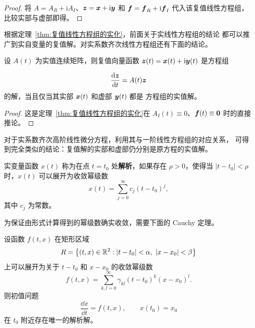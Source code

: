 \begin{proof}
	将 $A=A_R+\mathrm{i}A_I$、$\boldsymbol{z}=\boldsymbol{x}+\mathrm{i}\boldsymbol{y}$
	和 $\boldsymbol{f}=\boldsymbol{f}_R+\mathrm{i}\boldsymbol{f}_I$ 代入该复值线性方程组，
	比较实部与虚部即得。
\end{proof}

根据定理~\ref{thm:复值线性方程组的实化}，前面关于实线性方程组的结论
都可以推广到实自变量的复值解。对实系数齐次线性方程组还有下面的结论。

\begin{proposition}\label{thm:实系数齐次方程组的复值解}
	设 $A(t)$ 为实值连续矩阵，则复值向量函数
	$\boldsymbol{z}(t)=\boldsymbol{x}(t)+\mathrm{i}\boldsymbol{y}(t)$ 是方程组

	\[ 	\dfrac{\mathrm{d}\boldsymbol{z}}{\mathrm{d} t}=A(t)\boldsymbol{z}
 \]
	的解，当且仅当其实部 $\boldsymbol{x}(t)$ 和虚部 $\boldsymbol{y}(t)$ 都是
	方程组的实值解。
\end{proposition}

\begin{proof}
	这是定理~\ref{thm:复值线性方程组的实化}在
	$A_I(t)\equiv 0$、$\boldsymbol{f}(t)\equiv\boldsymbol{0}$ 时的直接推论。
\end{proof}

对于实系数齐次高阶线性微分方程，利用其与一阶线性方程组的对应关系，
可得到完全类似的结论：复值解的实部和虚部仍分别是原方程的实值解。

\begin{definition}\label{def:实解析函数}
	实变量函数 $x(t)$ 称为在点 $t=t_0$ 处\textbf{解析}，如果存在
	$\rho>0$，使得当 $|t-t_0|<\rho$ 时，$x(t)$ 可以展开为收敛幂级数
	\[
		x(t)=\sum_{j=0}^{\infty}c_j(t-t_0)^j,
	\]
	其中 $c_j$ 为常数。
\end{definition}

为保证由形式计算得到的幂级数确实收敛，需要下面的 Cauchy 定理。

\begin{theorem}[Cauchy 定理]\label{thm:Cauchy解析解定理}
	设函数 $f(t,x)$ 在矩形区域
	\[
		R=\bigl\{(t,x)\in\mathbb{R}^2:
		|t-t_0|<\alpha,\ |x-x_0|<\beta\bigr\}
	\]
	上可以展开为关于 $t-t_0$ 和 $x-x_0$ 的收敛幂级数
	\[
		f(t,x)=\sum_{k,l=0}^{\infty}
		\gamma_{kl}(t-t_0)^k(x-x_0)^l.
	\]
	则初值问题
	\[
		\dfrac{\dd x}{\dd t}=f(t,x),
		\qquad x(t_0)=x_0
	\]
	在 $t_0$ 附近存在唯一的解析解。
\end{theorem}

